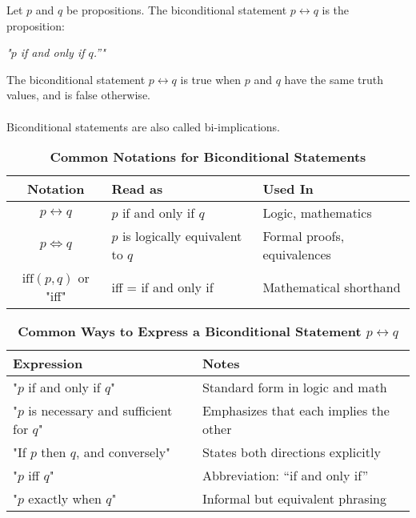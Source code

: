 \vspace{5pt}
\begin{tcolorbox}[title=Definition: Biconditional Statement]
Let $p$ and $q$ be propositions. The biconditional statement  $p \leftrightarrow q$ is the proposition:  
\begin{center}
\textit{"$p$ if and only if $q$.”"}
\end{center}
The biconditional statement $p \leftrightarrow q$ is true when $p$ and $q$ have the same truth values,
and is false otherwise.  \\ \\
Biconditional statements are also called bi-implications.
\end{tcolorbox}
\begin{table}[h!]
\centering
\caption*{\textbf{Common Notations for Biconditional Statements}}
\begin{tabular}{|c|l|l|}
\hline
\rowcolor{gray!20}
\textbf{Notation} & \textbf{Read as} & \textbf{Used In} \\
\hline
$p \leftrightarrow q$ & $p$ if and only if $q$ & Logic, mathematics \\
$p \Leftrightarrow q$ & $p$ is logically equivalent to $q$ & Formal proofs, equivalences \\
$\text{iff}(p, q)$ or "iff" & iff = if and only if & Mathematical shorthand \\
\hline
\end{tabular}
\end{table}
\begin{table}[h!]
\centering
\caption*{\textbf{Common Ways to Express a Biconditional Statement $p \leftrightarrow q$}}
\begin{tabular}{|p{5.5cm}|p{6.5cm}|}
\hline
\rowcolor{gray!20}
\textbf{Expression} & \textbf{Notes} \\
\hline
"$p$ if and only if $q$" & Standard form in logic and math \\
"$p$ is necessary and sufficient for $q$" & Emphasizes that each implies the other \\
"If $p$ then $q$, and conversely" & States both directions explicitly \\
"$p$ iff $q$" & Abbreviation: “if and only if” \\
"$p$ exactly when $q$" & Informal but equivalent phrasing \\
\hline
\end{tabular}
\end{table}
